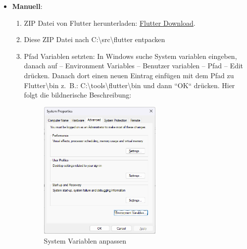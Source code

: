 \begin{itemize}
    \item \textbf{Manuell}:
    \begin{enumerate}
        \item ZIP Datei von Flutter herunterladen: \href{https://storage.googleapis.com/flutter_infra_release/releases/stable/windows/flutter_windows_3.7.3-stable.zip}{Flutter Download}.
        \item Diese ZIP Datei nach C:\textbackslash src\textbackslash flutter entpacken
        \item Pfad Variablen setzten: In Windows suche System variablen eingeben, danach auf – Environment Variables – Benutzer variablen – Pfad – Edit drücken. Danach dort einen neuen Eintrag einfügen mit dem Pfad zu Flutter\textbackslash bin z. B.: C:\textbackslash tools\textbackslash flutter\textbackslash bin und dann ``OK`` drücken. Hier folgt die bildnerische Beschreibung:
        \begin{figure}[!h]
        \vspace{0.5cm}
        \centering
        \includegraphics[width=0.6\textwidth]{FLUTTER/images/ZB/flutter_path_variable.png}
        \caption{System Variablen anpassen}
        \end{figure}
        \begin{figure}[!h]
        \centering


\end{figure}
\end{enumerate}
\end{itemize}
